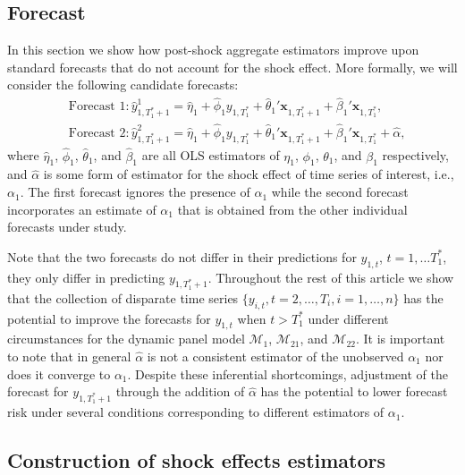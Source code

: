 \documentclass[11pt]{article}
\newcommand{\x}{\textbf{x}}
\def\mc#1{\mathcal{#1}} %
\def\E#1{\mathrm{E}(#1)} %
\theoremstyle{definition}
\begin{document}
\subsection{Forecast}
\label{forecast}
In this section we show how post-shock aggregate estimators improve upon standard 
forecasts that do not account for the shock effect.
More formally, we will consider the following candidate forecasts: 
\begin{align*}
  &\text{Forecast 1}: \hat y_{1,T_1^*+1}^1 = \hat\eta_1 
    + \hat\phi_1 y_{1,T_1^*} + \hat\theta_1'\x_{1,T_1^*+1} 
    + \hat\beta_1'\x_{1,T_1^*}, \\
  &\text{Forecast 2}: \hat y_{1,T_1^*+1}^2 = \hat\eta_1 
    + \hat\phi_1 y_{1,T_1^*} + \hat\theta_1'\x_{1,T_1^*+1} 
    + \hat\beta_1'\x_{1,T_1^*} + \hat{\alpha},
\end{align*}
where $\hat\eta_1$, $\hat\phi_1$, $\hat\theta_1$, and $\hat\beta_1$ are all 
OLS estimators of $\eta_1$, $\phi_1$, $\theta_1$, and $\beta_1$ respectively, 
and $\hat{\alpha}$ is some form of estimator for the shock effect of time series of interest, i.e., $\alpha_1$. 
The first forecast ignores the presence of $\alpha_1$ while the second forecast 
incorporates an estimate of $\alpha_1$ that is obtained from the other individual 
forecasts under study. 

Note that the two forecasts do not differ in their predictions for 
$y_{1,t}$, $t = 1,\ldots T_1^*$, they only differ in predicting 
$y_{1,T_1^*+1}$. Throughout the rest of this article we show that the collection of 
disparate time series $\{y_{i,t}, t = 2,\ldots,T_i, i = 1,\ldots,n\}$ has 
the potential to improve the forecasts for $y_{1, t}$ when $t > T_1^*$ under different 
circumstances for the dynamic panel model $\mc{M}_1$, $\mc{M}_{21}$, and $\mc{M}_{22}$. 
It is important to note that in general $\hat{\alpha}$ 
is not a consistent estimator of the unobserved $\alpha_1$ nor does it converge 
to $\alpha_1$.  Despite these inferential shortcomings, adjustment of the forecast 
for $y_{1,T_1^*+1}$ through the addition of $\hat{\alpha}$ has 
the potential to lower forecast risk under several conditions corresponding to 
different estimators of $\alpha_1$. %


\subsection{Construction of shock effects estimators}
\label{constructionofestimators}
\end{document}
